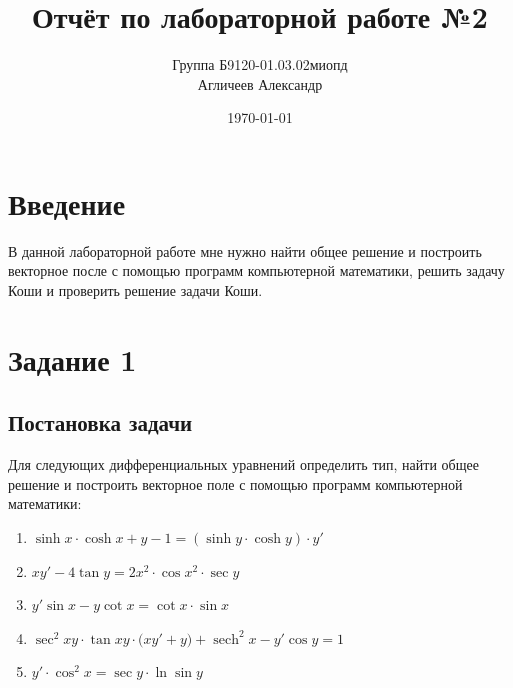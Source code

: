 \documentclass[a4paper, 14pt, titlepage, fleqn]{extarticle}
\author {
	Группа Б9120-01.03.02миопд\\
	Агличеев Александр
}
\title {
	Отчёт по лабораторной работе №2
}
\date {
	\today
}
\DeclareMathOperator\sech{sech}
\begin{document}
	\maketitle
	\tableofcontents
	\pagebreak	

	\section*{Введение}
		В данной лабораторной работе мне нужно найти общее решение и построить векторное после с помощью программ компьютерной математики, решить задачу Коши и проверить решение задачи Коши.
	
	\pagebreak
	\section*{Задание 1}
		\subsection*{Постановка задачи}
			\noindent Для следующих дифференциальных уравнений определить тип, найти общее
			решение и построить векторное поле с помощью программ компьютерной математики:
		\begin{enumerate}
			 \item \(\sinh{x} \cdot \cosh{x} + y - 1 = ( \sinh{y} \cdot \cosh{y}) \cdot y'\)
			 \item \(xy' - 4 \tan{y} = 2x^2 \cdot \cos{x^2} \cdot \sec{y} \)
			 \item \(y' \sin{x} - y \cot{x} = \cot{x} \cdot \sin{x} \)
			 \item \( \sec^2{xy} \cdot \tan{xy} \cdot \big(xy' + y\big) + \sech^2{x} - y' \cos{y} = 1 \)
			 \item \( y' \cdot \cos^2{x} = \sec{y} \cdot \ln{\sin{y}} \)
		\end{enumerate}
\end{document}
